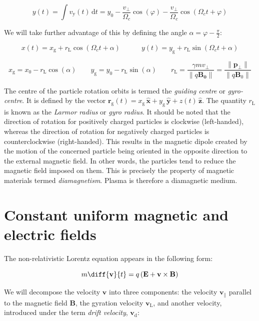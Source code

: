 \begin{equation}
    y(t)=\int v_\mathrm{y}(t)\,\mathrm{d}t=y_0-\frac{v_\perp}{\Omega_c}\cos(\varphi)-\frac{v_\perp}{\Omega_c}\cos(\Omega_ct+\varphi)
\end{equation}

We will take further advantage of this by defining the angle $\alpha=\varphi-\frac{\pi}{2}$:

\begin{equation}
    x(t)=x_\text{g}+r_\text{L}\cos(\Omega_ct+\alpha)\quad\quad\quad y(t)=y_\text{g}+r_\text{L}\sin(\Omega_ct+\alpha)
\end{equation}

\begin{equation}
    x_\text{g}=x_0-r_\text{L}\cos(\alpha)\qquad y_\text{g}=y_0-r_\text{L}\sin(\alpha)\qquad r_\text{L}=\frac{\gamma mv_\perp}{\|q\mathbf{B_0}\|}=\frac{\|\mathbf{p}_\perp\|}{\|q\mathbf{B}_0\|}
\end{equation}

The centre of the particle rotation orbits is termed the \textit{guiding centre} or \textit{gyro-centre}. It is defined by the vector $\mathbf{r}_\text{g}(t)=x_\text{g}\,\mathbf{\hat{x}}+y_\text{g}\,\mathbf{\hat{y}}+z(t)\,\mathbf{\hat{z}}$. The quantity $r_\text{L}$ is known as the \textit{Larmor radius} or \textit{gyro radius}. It should be noted that the direction of rotation for positively charged particles is clockwise (left-handed), whereas the direction of rotation for negatively charged particles is counterclockwise (right-handed). This results in the magnetic dipole created by the motion of the concerned particle being oriented in the opposite direction to the external magnetic field. In other words, the particles tend to reduce the magnetic field imposed on them. This is precisely the property of magnetic materials termed \textit{diamagnetism}. Plasma is therefore a diamagnetic medium.

\section{Constant uniform magnetic and electric fields}

The non-relativistic Lorentz equation appears in the following form:

\begin{equation}
    m\diff{\mathbf{v}}{t}=q\left(\mathbf{E}+\mathbf{v}\times\mathbf{B}\right)
\end{equation}

We will decompose the velocity $\mathbf{v}$ into three components: the velocity $\mathbf{v}_\parallel$ parallel to the magnetic field $\mathbf{B}$, the gyration velocity $\mathbf{v}_\text{L}$, and another velocity, introduced under the term \textit{drift velocity}, $\mathbf{v}_\mathrm{d}$:

